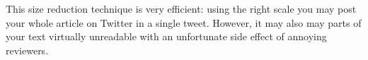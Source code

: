 \documentclass{easychair}
\begin{document}
			This size reduction technique is very efficient: using the right scale
			you may post your whole article on Twitter in a single tweet. However,
			it may also may parts of your text virtually unreadable with an
			unfortunate side effect of annoying reviewers. 



\end{document}

